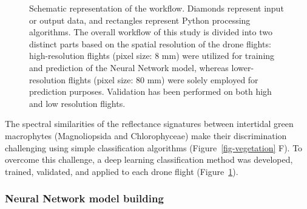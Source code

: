 \documentclass[
  number]{elsarticle}
\begin{document}
\label{cell-fig-workflow}
\begin{figure}[H]


\caption{\label{fig-workflow}Schematic representation of the workflow.
Diamonds represent input or output data, and rectangles represent Python
processing algorithms. The overall workflow of this study is divided
into two distinct parts based on the spatial resolution of the drone
flights: high-resolution flights (pixel size: 8 mm) were utilized for
training and prediction of the Neural Network model, whereas
lower-resolution flights (pixel size: 80 mm) were solely employed for
prediction purposes. Validation has been performed on both high and low
resolution flights.}

\end{figure}%

The spectral similarities of the reflectance signatures between
intertidal green macrophytes (Magnoliopsida and Chlorophyceae) make
their discrimination challenging using simple classification algorithms
(Figure~\ref{fig-vegetation} F). To overcome this challenge, a deep
learning classification method was developed, trained, validated, and
applied to each drone flight (Figure~\ref{fig-workflow}).

\subsubsection{Neural Network model
building}\label{neural-network-model-building}
\end{document}
